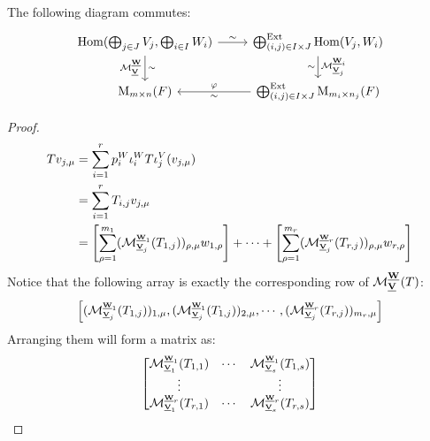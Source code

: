 \begin{theorem}
    The following diagram commutes:
    \[
        \begin{tikzcd}
            \Hom(\bigoplus_{j \in J}V_j, \bigoplus_{i \in I}W_i) \arrow[r, "\sim"]  \arrow[d, "\calM^{\bss{W}{}}_{\bss{V}{}}"', "\sim"]
            & \bigoplus^{\Ext}_{(i, j) \in I \times J} \Hom(V_j, W_i) \arrow[d, "\calM^{\bss{W}{i}}_{\bss{V}{j}}", "\sim"']
            \\
            \Mat_{m \times n}(F)
            & \bigoplus^{\Ext}_{(i, j) \in I \times J} \Mat_{m_i \times n_j}(F)  \arrow[l, "\varphi"', "\sim"]
        \end{tikzcd}
    \]
\end{theorem}
\begin{proof}
    \begin{equation*}
        \begin{aligned}
            T v_{j, \mu} &= \sum_{i=1}^r p_i^W \iota_i^W T \iota_j^V (v_{j, \mu}) \\
            &= \sum_{i=1}^r T_{i,j} v_{j, \mu} \\
            &= \left[ \sum_{\rho=1}^{m_1} (\calM^{\bss{W}{1}}_{\bss{V}{j}}(T_{1,j}))_{\rho, \mu} w_{1, \rho} \right] + \cdots + \left[ \sum_{\rho=1}^{m_r} (\calM^{\bss{W}{r}}_{\bss{V}{j}}(T_{r,j}))_{\rho, \mu} w_{r, \rho} \right] \\
        \end{aligned}
    \end{equation*}
    Notice that the following array is exactly the corresponding row of $\calM^{\bs{W}{}}_{\bs{V}{}}(T)$:
    \begin{equation*}
        \begin{bmatrix}
            (\calM^{\bss{W}{1}}_{\bss{V}{j}}(T_{1,j}))_{1, \mu}, (\calM^{\bss{W}{1}}_{\bss{V}{j}}(T_{1,j}))_{2, \mu}, \cdots, (\calM^{\bss{W}{r}}_{\bss{V}{j}}(T_{r,j}))_{m_r, \mu}
        \end{bmatrix}
    \end{equation*}
    Arranging them will form a matrix as:
    \begin{equation*}
        \begin{bmatrix}
            \calM^{\bss{W}{1}}_{\bss{V}{1}}(T_{1,1}) & \cdots & \calM^{\bss{W}{1}}_{\bss{V}{s}}(T_{1,s}) \\
            \vdots & & \vdots \\
            \calM^{\bss{W}{r}}_{\bss{V}{1}}(T_{r,1}) & \cdots & \calM^{\bss{W}{r}}_{\bss{V}{s}}(T_{r,s})
        \end{bmatrix}
    \end{equation*}
\end{proof}



